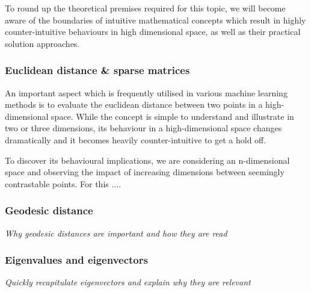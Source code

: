 
To round up the theoretical premises required for this topic, we will become aware of the boundaries of intuitive mathematical concepts which result in highly counter-intuitive behaviours in high dimensional space, as well as their practical solution approaches.

\subsubsection{Euclidean distance \& sparse matrices}

An important aspect which is frequently utilised in various machine learning methods is to evaluate the euclidean distance between two points in a high-dimensional space.
While the concept is simple to understand and illustrate in two or three dimensions, its behaviour in a high-dimensional space changes dramatically and it becomes heavily counter-intuitive to get a hold off.

To discover its behavioural implications, we are considering an n-dimensional space and observing the impact of increasing dimensions between seemingly contrastable points. 
For this .... 

\vspace{8mm}

\noindent
\begin{minipage}[c]{0.45\linewidth}

\subsubsection{Geodesic distance}

\begin{center}
	\textit{Why geodesic distances are important and how they are read}
\end{center}

\vspace{1mm}

\begin{center}
	\renewcommand{\tikzscale}{0.4}
	
	\vspace*{2mm}
	\captionsetup{justification=centering,type=htypei}
	\label{fig:geodesicdistance}
\end{center}


\end{minipage}\hfill%
\begin{minipage}[c]{0.45\linewidth}

\subsubsection{Eigenvalues and eigenvectors}

\begin{center}
	\textit{Quickly recapitulate eigenvectors and explain why they are relevant}
\end{center}


\end{minipage}%

